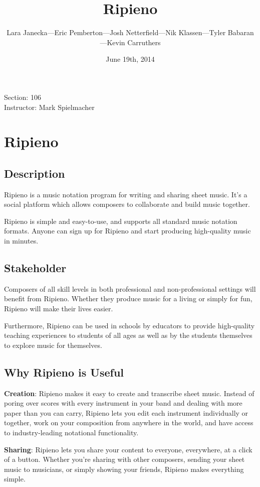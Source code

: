 \documentclass[12pt]{article}
\title{Ripieno}
\author{Lara Janecka---Eric Pemberton---Josh Netterfield---Nik Klassen---Tyler Babaran---Kevin Carruthers}
\date{June 19th, 2014}
\begin{document}
\maketitle
Section: 106\\
Instructor: Mark Spielmacher

\section{Ripieno}
\subsection{Description}
Ripieno is a music notation program for writing and sharing sheet music. It's a social platform which allows composers to collaborate and build music together.

Ripieno is simple and easy-to-use, and supports all standard music notation formats. Anyone can sign up for Ripieno and start producing high-quality music in minutes.

\subsection{Stakeholder}
Composers of all skill levels in both professional and non-professional settings will benefit from Ripieno. Whether they produce music for a living or simply for fun, Ripieno will make their lives easier.

Furthermore, Ripieno can be used in schools by educators to provide high-quality teaching experiences to students of all ages as well as by the students themselves to explore music for themselves.

\subsection{Why Ripieno is Useful}
{\bf Creation}: Ripieno makes it easy to create and transcribe sheet music. Instead of poring over scores with every instrument in your band and dealing with more paper than you can carry, Ripieno lets you edit each instrument individually or together, work on your composition from anywhere in the world, and have access to industry-leading notational functionality.

{\bf Sharing}: Ripieno lets you share your content to everyone, everywhere, at a click of a button. Whether you're sharing with other composers, sending your sheet music to musicians, or simply showing your friends, Ripieno makes everything simple.
\end{document}
